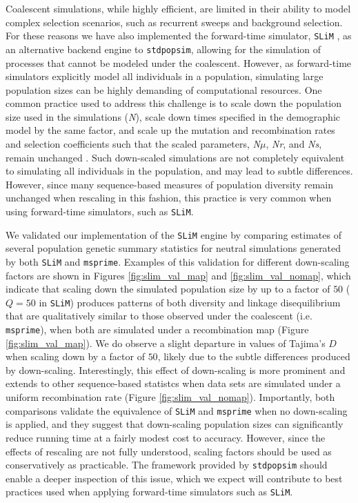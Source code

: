 \documentclass[12pt,halfline,a4paper]{ouparticle}
\begin{document}
Coalescent simulations, while highly efficient, are limited in their ability to model
complex selection scenarios, such as recurrent sweeps and background selection. For these reasons
we have also implemented the forward-time simulator, \texttt{SLiM} \citep{haller2019tree,haller2019slim},
as an alternative backend engine to \texttt{stdpopsim}, allowing for the simulation of processes that cannot be modeled under
the coalescent. However, as forward-time simulators explicitly model all individuals in a population, simulating large
population sizes can be highly demanding of computational resources. One common practice used to address this challenge is to
scale down the population size used in the simulations (\textit{N}),
scale down times specified in the demographic model by the same factor, and scale up the mutation and recombination
rates and selection coefficients such that the scaled parameters, \textit{N$\mu$}, \textit{Nr},
and \textit{Ns}, remain unchanged \citep[see the \texttt{SLiM} manual and][]{uricchio2014robust}.
Such down-scaled simulations are not completely equivalent to simulating
all individuals in the population, and may lead to subtle differences.
However, since many sequence-based measures of population diversity remain unchanged when rescaling in this fashion,
this practice is very common when using forward-time simulators, such as \texttt{SLiM}.

We validated our implementation of the \texttt{SLiM} engine by comparing
estimates of several population genetic summary statistics for neutral simulations generated by both \texttt{SLiM}
and \texttt{msprime}.
Examples of this validation for different down-scaling factors are shown in
Figures \ref{fig:slim_val_map} and \ref{fig:slim_val_nomap}, which indicate that scaling down the simulated
population size by up to a factor
of $50$ ($Q=50$ in \texttt{SLiM}) produces patterns of both diversity and linkage disequilibrium that are
qualitatively similar to those observed under the coalescent (i.e. \texttt{msprime}), when both are simulated under a recombination map
(Figure \ref{fig:slim_val_map}).
We do observe a slight departure in values of Tajima's $D$ when scaling down by a factor of $50$,
likely due to the subtle differences produced by down-scaling.
Interestingly, this effect of down-scaling is more prominent and extends to other sequence-based statistcs
when data sets are simulated under a uniform recombination rate (Figure \ref{fig:slim_val_nomap}).
Importantly, both comparisons validate the equivalence of \texttt{SLiM} and \texttt{msprime} when no down-scaling is applied,
and they suggest that down-scaling population sizes can significantly reduce running time at a fairly modest cost to accuracy.
However, since the effects of rescaling are not fully understood, scaling factors should be used as conservatively as practicable.
The framework provided by \texttt{stdpopsim} should enable a deeper inspection of this issue, which we expect will contribute to
best practices used when applying forward-time simulators such as \texttt{SLiM}.
\end{document}
